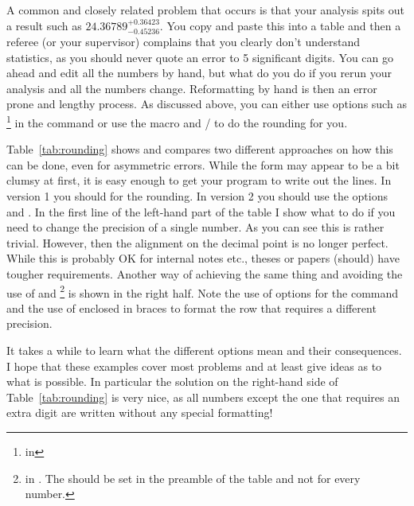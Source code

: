 A common and closely related problem that occurs is that your analysis
spits out a result such as $24.36789^{+0.36423}_{-0.45236}$. You copy
and paste this into a table and then a referee (or your supervisor)
complains that you clearly don't understand statistics, as you should
never quote an error to 5 significant digits. You can go ahead and
edit all the numbers by hand, but what do you do if you rerun your
analysis and all the numbers change. Reformatting by hand is then an
error prone and lengthy process. As discussed above, you can either
use options such as \footnote{ in
  } in the  command or use the macro
 and / to do the
rounding for you.

Table~\ref{tab:rounding} shows and compares two different approaches
on how this can be done, even for asymmetric errors. While the form
may appear to be a bit clumsy at first, it is easy enough to get your
program to write out the lines. In  version 1 you
should  for the rounding. In version 2 you should use the
options  and . In the first
line of the left-hand part of the table I show what to do if you need
to change the precision of a single number.  As you can see this is
rather trivial. However, then the alignment on the decimal point is no
longer perfect. While this is probably OK for internal notes etc.,
theses or papers (should) have tougher requirements. Another way of
achieving the same thing and avoiding the use of
 and \footnote{
  in . The  should be set in the
  preamble of the table and not for every number.} is shown in the
right half. Note the use of options for the  command and the
use of  enclosed in braces to format the row that requires
a different precision.

It takes a while to learn what the different options mean and their
consequences. I hope that these examples cover most problems and at
least give ideas as to what is possible.  In particular the solution
on the right-hand side of Table~\ref{tab:rounding} is very nice, as
all numbers except the one that requires an extra digit are written
without any special formatting!

